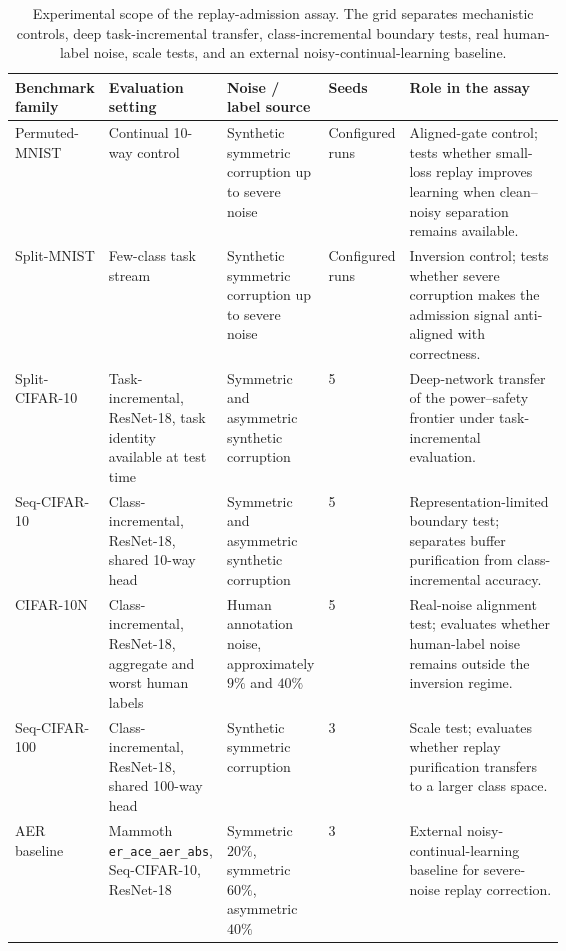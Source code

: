 \documentclass[preprint,12pt]{elsarticle}
\begin{document}
\begin{table}[H]
\centering
\caption{Experimental scope of the replay-admission assay. The grid separates mechanistic controls, deep task-incremental transfer, class-incremental boundary tests, real human-label noise, scale tests, and an external noisy-continual-learning baseline.}
\label{tab:experimental_scope}
\scriptsize
\setlength{\tabcolsep}{3pt}
\renewcommand{\arraystretch}{1.08}
\begin{tabularx}{\linewidth}{@{}p{0.17\linewidth}p{0.17\linewidth}p{0.18\linewidth}p{0.12\linewidth}Y@{}}
\toprule
Benchmark family & Evaluation setting & Noise / label source & Seeds & Role in the assay \\
\midrule
Permuted-MNIST & Continual 10-way control & Synthetic symmetric corruption up to severe noise & Configured runs & Aligned-gate control; tests whether small-loss replay improves learning when clean--noisy separation remains available. \\
Split-MNIST & Few-class task stream & Synthetic symmetric corruption up to severe noise & Configured runs & Inversion control; tests whether severe corruption makes the admission signal anti-aligned with correctness. \\
Split-CIFAR-10 & Task-incremental, ResNet-18, task identity available at test time & Symmetric and asymmetric synthetic corruption & 5 & Deep-network transfer of the power--safety frontier under task-incremental evaluation. \\
Seq-CIFAR-10 & Class-incremental, ResNet-18, shared 10-way head & Symmetric and asymmetric synthetic corruption & 5 & Representation-limited boundary test; separates buffer purification from class-incremental accuracy. \\
CIFAR-10N & Class-incremental, ResNet-18, aggregate and worst human labels & Human annotation noise, approximately $9\%$ and $40\%$ & 5 & Real-noise alignment test; evaluates whether human-label noise remains outside the inversion regime. \\
Seq-CIFAR-100 & Class-incremental, ResNet-18, shared 100-way head & Synthetic symmetric corruption & 3 & Scale test; evaluates whether replay purification transfers to a larger class space. \\
AER baseline & Mammoth \texttt{er\_ace\_aer\_abs}, Seq-CIFAR-10, ResNet-18 & Symmetric $20\%$, symmetric $60\%$, asymmetric $40\%$ & 3 & External noisy-continual-learning baseline for severe-noise replay correction. \\
\bottomrule
\end{tabularx}
\end{table}
\end{document}
